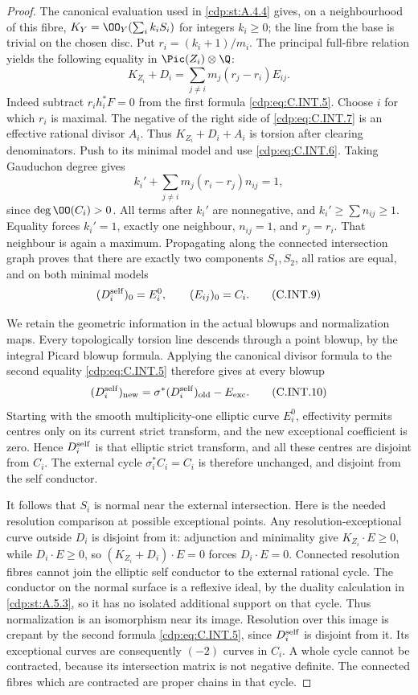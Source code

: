 \begin{proof}
The canonical evaluation used in \ref{cdp:st:A.4.4} gives, on a
neighbourhood of this fibre,
$K_Y=\OO_Y(\sum_i k_iS_i)$ for integers $k_i\ge0$;
the line from the base is trivial on the chosen disc.
Put $r_i=(k_i+1)/m_i$. The principal full-fibre
relation yields the following equality in
$\Pic(Z_i)\otimes\Q$:
\[
 K_{Z_i}+D_i
   =\sum_{j\ne i}m_j(r_j-r_i)E_{ij}.
 \tag{C.INT.7}\label{cdp:eq:C.INT.7}
\]
Indeed subtract $r_i h_i^*F=0$ from the first
formula \eqref{cdp:eq:C.INT.5}. Choose $i$ for which $r_i$ is
maximal. The negative of the right side of
\eqref{cdp:eq:C.INT.7} is an effective rational divisor $A_i$.
Thus $K_{Z_i}+D_i+A_i$ is torsion after clearing
denominators. Push to its minimal model and use
\eqref{cdp:eq:C.INT.6}. Taking Gauduchon degree gives
\[
 k_i'+\sum_{j\ne i}m_j(r_i-r_j)n_{ij}=1,
 \tag{C.INT.8}\label{cdp:eq:C.INT.8}
\]
since $\deg\OO(C_i)>0$. All terms after $k_i'$
are nonnegative, and $k_i'\ge\sum n_{ij}\ge1$.
Equality forces $k_i'=1$, exactly one neighbour,
$n_{ij}=1$, and $r_j=r_i$. That neighbour is again
a maximum. Propagating along the connected
intersection graph proves that there are exactly
two components $S_1,S_2$, all ratios are equal,
and on both minimal models
\[
 (D_i^{\rm self})_0=E_i^0,
 \qquad (E_{ij})_0=C_i.
 \tag{C.INT.9}\label{cdp:eq:C.INT.9}
\]

We retain the geometric information in the actual
blowups and normalization maps. Every topologically
torsion line descends through a point blowup, by the
integral Picard blowup formula. Applying the
canonical divisor formula to the second equality
\eqref{cdp:eq:C.INT.5} therefore gives at every blowup
\[
 (D_i^{\rm self})_{\rm new}
   =\sigma^*(D_i^{\rm self})_{\rm old}-E_{\rm exc}.
 \tag{C.INT.10}\label{cdp:eq:C.INT.10}
\]
Starting with the smooth multiplicity-one elliptic
curve $E_i^0$, effectivity permits centres only on
its current strict transform, and the new
exceptional coefficient is zero. Hence
$D_i^{\rm self}$ is that elliptic strict transform,
and all these centres are disjoint from $C_i$.
The external cycle $\sigma_i^*C_i=C_i$ is therefore
unchanged, and disjoint from the self conductor.

It follows that $S_i$ is normal near the external
intersection. Here is the needed resolution
comparison at possible exceptional points. Any
resolution-exceptional curve outside $D_i$ is
disjoint from it: adjunction and minimality give
$K_{Z_i}\cdot E\ge0$, while $D_i\cdot E\ge0$,
so $(K_{Z_i}+D_i)\cdot E=0$ forces $D_i\cdot E=0$.
Connected resolution fibres cannot join the
elliptic self conductor to the external rational
cycle. The conductor on the normal surface is a
reflexive ideal, by the duality calculation in
\ref{cdp:st:A.5.3}, so it has no isolated additional support
on that cycle. Thus normalization is an isomorphism
near its image. Resolution over this image is
crepant by the second formula \eqref{cdp:eq:C.INT.5}, since
$D_i^{\rm self}$ is disjoint from it. Its
exceptional curves are consequently $(-2)$
curves in $C_i$. A whole cycle cannot be contracted,
because its intersection matrix is not negative
definite. The connected fibres which are
contracted are proper chains in that cycle.


\end{proof}
